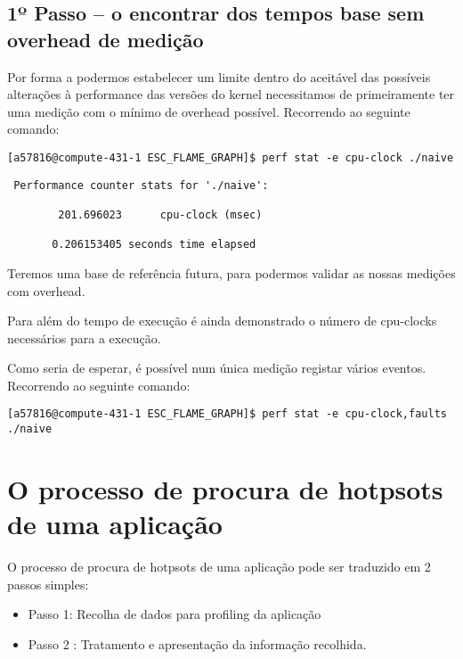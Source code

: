 \documentclass[conference,compsoc]{IEEEtran}
\begin{document}
\begin{itemize}
\subsection{1º Passo -- o encontrar dos tempos base sem overhead de medição}

Por forma 	a podermos estabelecer um limite dentro do aceitável das possíveis alterações à performance das versões do kernel necessitamos de primeiramente ter uma medição com o mínimo de overhead possível. Recorrendo ao seguinte comando:

 \begin{lstlisting}[style=command]
[a57816@compute-431-1 ESC_FLAME_GRAPH]$ perf stat -e cpu-clock ./naive
   \end{lstlisting}
\begin{lstlisting}
 Performance counter stats for './naive':

        201.696023      cpu-clock (msec)                                            

       0.206153405 seconds time elapsed
\end{lstlisting}
Teremos uma base de referência futura, para podermos validar as nossas medições com overhead.\par 
Para além do tempo de execução é ainda demonstrado o número de cpu-clocks necessários para a execução.\par  

Como seria de esperar, é possível num única medição registar vários eventos. Recorrendo ao seguinte comando:

 \begin{lstlisting}[style=command]
[a57816@compute-431-1 ESC_FLAME_GRAPH]$ perf stat -e cpu-clock,faults ./naive
   \end{lstlisting}

\section{O processo de procura de hotpsots de uma aplicação}       

O processo de procura de hotpsots de uma aplicação pode ser traduzido em 2 passos simples:
\begin{itemize}
\item Passo 1: Recolha de dados para profiling da aplicação
\item Passo 2 : Tratamento e apresentação da informação recolhida.
\end{itemize}
    

\end{itemize}
\end{document}
